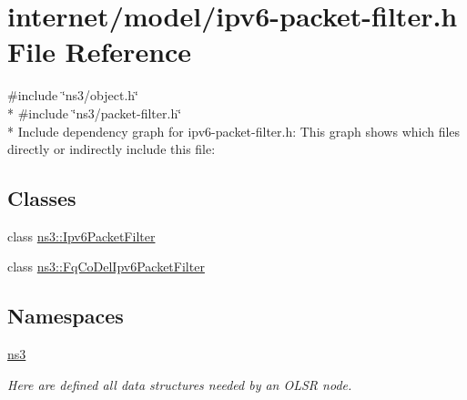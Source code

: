 \hypertarget{ipv6-packet-filter_8h}{}\section{internet/model/ipv6-\/packet-\/filter.h File Reference}
\label{ipv6-packet-filter_8h}
{\ttfamily \#include \char`\"{}ns3/object.\+h\char`\"{}}\\*
{\ttfamily \#include \char`\"{}ns3/packet-\/filter.\+h\char`\"{}}\\*
Include dependency graph for ipv6-\/packet-\/filter.h\+:
This graph shows which files directly or indirectly include this file\+:
\subsection*{Classes}
\begin{DoxyCompactItemize}
\item 
class \hyperlink{classns3_1_1Ipv6PacketFilter}{ns3\+::\+Ipv6\+Packet\+Filter}
\item 
class \hyperlink{classns3_1_1FqCoDelIpv6PacketFilter}{ns3\+::\+Fq\+Co\+Del\+Ipv6\+Packet\+Filter}
\end{DoxyCompactItemize}
\subsection*{Namespaces}
\begin{DoxyCompactItemize}
\item 
 \hyperlink{namespacens3}{ns3}
\begin{DoxyCompactList}\small\item\em Here are defined all data structures needed by an O\+L\+SR node. \end{DoxyCompactList}\end{DoxyCompactItemize}
